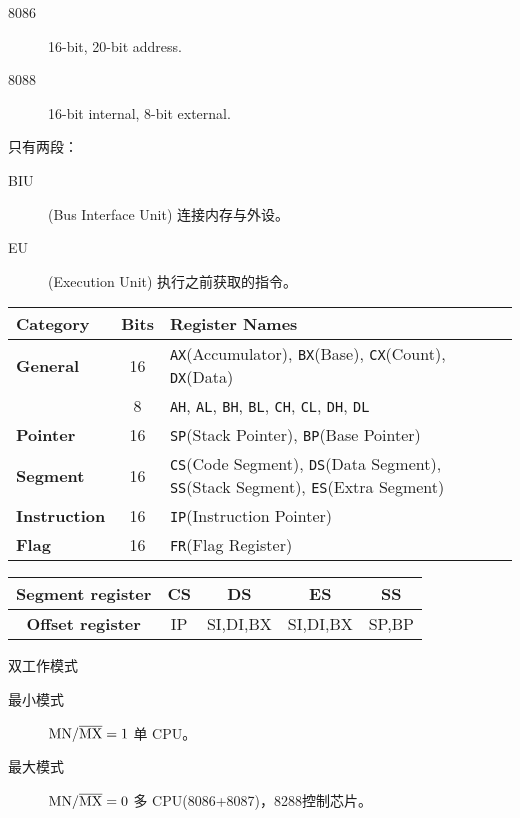 %
\begin{description}
\item[8086] 16-bit, 20-bit address.
\item[8088] 16-bit internal, 8-bit external.
\end{description}

只有两段：
\begin{description}
	\item[BIU](Bus Interface Unit) 连接内存与外设。
	\item[EU](Execution Unit) 执行之前获取的指令。
\end{description}

\begin{table*}
	\centering
	\caption{8086 寄存器}
	\begin{tabular}{|>{\bfseries}l|c|l|}
		\hline
		Category & \bfseries Bits &\bfseries Register Names \\
		\hline
		General & 16 & \texttt{AX}(Accumulator), \texttt{BX}(Base), \texttt{CX}(Count), \texttt{DX}(Data) \\
		\hline
		& 8 & \texttt{AH}, \texttt{AL}, \texttt{BH}, \texttt{BL}, \texttt{CH}, \texttt{CL}, \texttt{DH}, \texttt{DL} \\
		\hline
		Pointer & 16 & \texttt{SP}(Stack Pointer), \texttt{BP}(Base Pointer) \\
		\hline
		Segment & 16 & \texttt{CS}(Code Segment), \texttt{DS}(Data Segment), \texttt{SS}(Stack Segment), \texttt{ES}(Extra Segment) \\
		\hline
		Instruction & 16 & \texttt{IP}(Instruction Pointer) \\
		\hline
		Flag & 16 & \texttt{FR}(Flag Register) \\
		\hline
	\end{tabular}
	\caption{段偏移寄存器}
	\begin{tabular}{|>{\bfseries}c|>{\ttfamily}c|>{\ttfamily}c|>{\ttfamily}c|>{\ttfamily}c|}
		\hline
		Segment register & CS & DS & ES & SS \\
		\hline
		Offset register & IP & SI,DI,BX & SI,DI,BX & SP,BP \\
		\hline
	\end{tabular}
	
\end{table*}

双工作模式
\begin{description}
	\item[最小模式] $\rm MN/\overline{MX}=1$ 单 CPU。
	\item[最大模式] $\rm MN/\overline{MX}=0$ 多 CPU(8086+8087)，8288控制芯片。 
\end{description}

